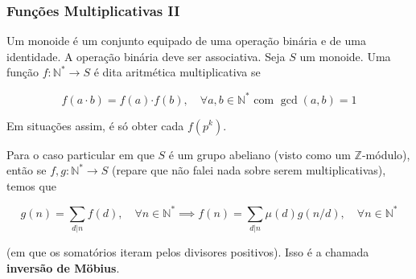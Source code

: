 \subsubsection{Funções Multiplicativas II}

Um monoide é um conjunto equipado de uma operação binária e de uma identidade. A operação
binária deve ser associativa. Seja $S$ um monoide. Uma função $f : \mathbb{N}^* \to S$ é
dita aritmética multiplicativa se 

$$ f(a \cdot b) = f(a) \mathbf{\cdot} f(b), \quad \forall a, b \in \mathbb{N}^* \text{ com } \gcd(a, b) = 1 $$

Em situações assim, é só obter cada $f(p^k)$.

Para o caso particular em que $S$ é um grupo abeliano (visto como um $\mathbb{Z}$-módulo), então se 
$f, g : \mathbb{N}^* \to S$ (repare que não falei nada sobre serem multiplicativas), temos que 

$$ g(n) = \sum\limits_{d | n} f(d), \quad \forall n \in \mathbb{N}^* \implies 
f(n) = \sum\limits_{d | n} \mu (d) g(n/d), \quad \forall n \in \mathbb{N}^*$$

(em que os somatórios iteram pelos divisores positivos). Isso é a chamada \textbf{inversão de Möbius}.

